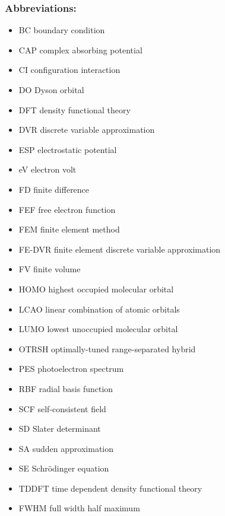 \subsubsection{Abbreviations:}
\begin{itemize}
   \item BC  boundary condition
   \item CAP complex absorbing potential
   \item CI configuration interaction
   \item DO Dyson orbital
   \item DFT density functional theory
   \item DVR discrete variable approximation
   \item ESP electrostatic potential
   \item eV electron volt
   \item FD finite difference
   \item FEF free electron function
   \item FEM finite element method
   \item FE-DVR finite element discrete variable approximation
   \item FV finite volume
   \item HOMO highest occupied molecular orbital
   \item LCAO linear combination of atomic orbitals
   \item LUMO lowest unoccupied molecular orbital
   \item OTRSH optimally-tuned range-separated hybrid
   \item PES photoelectron spectrum
   \item RBF radial basis function
   \item SCF self-consistent field
   \item SD Slater determinant
   \item SA sudden approximation
   \item SE Schr\"odinger equation
   \item TDDFT time dependent density functional theory
   \item FWHM full width half maximum
\end{itemize}

